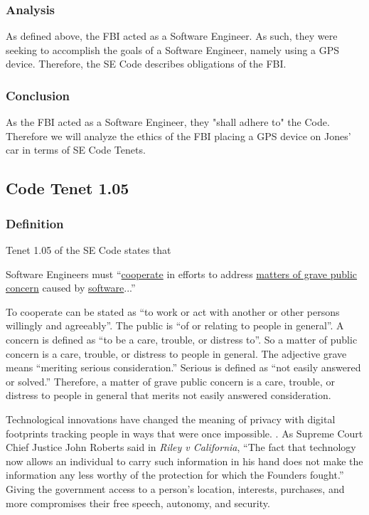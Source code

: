 \documentclass[12pt]{article}
\newcounter{subsubsubsection}[subsubsection]
\begin{document}
\begin{multicols}{2}
\subsubsection{Analysis}
As defined above, the FBI acted as a Software Engineer. 
As such, they were seeking to accomplish the goals of a Software Engineer, namely using a GPS device. 
Therefore, the SE Code describes obligations of the FBI.
\subsubsection{Conclusion}
As the FBI acted as a Software Engineer, they "shall adhere to" the Code. \cite{secode}
Therefore we will analyze the ethics of the FBI placing a GPS device on Jones' car in terms of SE Code Tenets.

\subsection{Code Tenet 1.05}
\subsubsection{Definition}
Tenet 1.05 of the SE Code states that 

\begin{framed}
Software Engineers must ``\underline{cooperate} in efforts to address \uline{matters of grave public concern} caused by \underline{software}...''\cite{secode}
\end{framed}
To cooperate can be stated as ``to work or act with another or other persons willingly and agreeably''. \cite{cooperate_def}
The public is ``of or relating to people in general''. \cite{dictionary}
A concern is defined as ``to be a care, trouble, or distress to''. \cite{dictionary}
So a matter of public concern is a care, trouble, or distress to people in general.
The adjective grave means ``meriting serious consideration.''\cite{dictionary}
Serious is defined as ``not easily answered or solved.''\cite{dictionary}
Therefore, a matter of grave public concern is a care, trouble, or distress to people in general that merits not easily answered consideration.

Technological innovations have changed the meaning of privacy with digital footprints tracking people in ways that were once impossible. \cite{aclu_privacy}. 
As Supreme Court Chief Justice John Roberts said in \textit{Riley v California}, ``The fact that technology now allows an individual to carry such information in his hand does not make the information any less worthy of the protection for which the Founders fought.''\cite{aclu_privacy}
Giving the government access to a person's location, interests, purchases, and more compromises their free speech, autonomy, and security. \cite{aclu_privacy, eff_privacy} 


\end{multicols}
\end{document}
